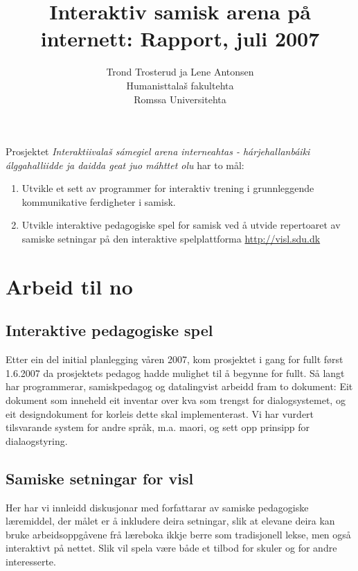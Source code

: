 \documentclass[a4paper,norsk]{article}
\begin{document}
\title{Interaktiv samisk arena på internett: Rapport, juli 2007}


\author{Trond Trosterud ja Lene Antonsen\\
Humanisttalaš fakultehta\\
Romssa Universitehta}

\maketitle


Prosjektet \textit{Interaktiivalaš sámegiel arena interneahtas - hárjehallanbáiki álggahalliidde ja daidda geat juo máhttet olu} har to mål:

\begin{enumerate}
\item Utvikle et sett av programmer for interaktiv trening i grunnleggende kommunikative ferdigheter i samisk. 
\item Utvikle interaktive pedagogiske spel for samisk ved å 
utvide repertoaret av samiske setningar på den interaktive spelplattforma \url{http://visl.sdu.dk}
\end{enumerate}

\section{Arbeid til no}

\subsection{Interaktive pedagogiske spel}

Etter ein del initial planlegging våren 2007, kom prosjektet i gang for fullt først 1.6.2007 da prosjektets pedagog hadde mulighet til å begynne for fullt. Så langt har programmerar, samiskpedagog og datalingvist arbeidd fram to dokument: Eit dokument som inneheld eit inventar over kva som trengst for dialogsystemet, og eit designdokument for korleis dette skal implementerast.   Vi har vurdert tilsvarande system for andre språk, m.a. maori, og sett opp prinsipp for dialaogstyring.

\subsection{Samiske setningar for visl}

Her har vi innleidd diskusjonar med forfattarar av samiske pedagogiske læremiddel, der målet er å inkludere deira setningar, slik at elevane deira kan bruke arbeidsoppgåvene frå læreboka ikkje berre som tradisjonell lekse, men også interaktivt på nettet. Slik vil spela være både et tilbod for skuler og for andre interesserte.
\end{document}
